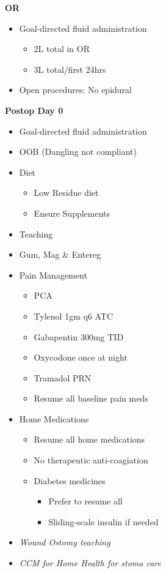\documentclass[
  letterpaper,
]{scrbook}
\providecommand{\tightlist}{%
  \setlength{\itemsep}{0pt}\setlength{\parskip}{0pt}}
\begin{document}
\textbf{OR}

\begin{itemize}
\tightlist
\item
  Goal-directed fluid administration

  \begin{itemize}
  \tightlist
  \item
    2L total in OR
  \item
    3L total/first 24hrs
  \end{itemize}
\item
  Open procedures: No epidural
\end{itemize}

\textbf{Postop Day 0}

\begin{itemize}
\tightlist
\item
  Goal-directed fluid administration
\item
  OOB (Dangling not compliant)
\item
  Diet

  \begin{itemize}
  \tightlist
  \item
    Low Residue diet
  \item
    Ensure Supplements
  \end{itemize}
\item
  Teaching
\item
  Gum, Mag \& Entereg
\item
  Pain Management

  \begin{itemize}
  \tightlist
  \item
    PCA
  \item
    Tylenol 1gm q6 ATC
  \item
    Gabapentin 300mg TID
  \item
    Oxycodone once at night
  \item
    Tramadol PRN
  \item
    Resume all baseline pain meds
  \end{itemize}
\item
  Home Medications

  \begin{itemize}
  \tightlist
  \item
    Resume all home medications
  \item
    No therapeutic anti-coagiation
  \item
    Diabetes medicines

    \begin{itemize}
    \tightlist
    \item
      Prefer to resume all
    \item
      Sliding-scale insulin if needed
    \end{itemize}
  \end{itemize}
\item
  \emph{Wound Ostomy teaching}
\item
  \emph{CCM for Home Health for stoma care}
\end{itemize}
\end{document}
